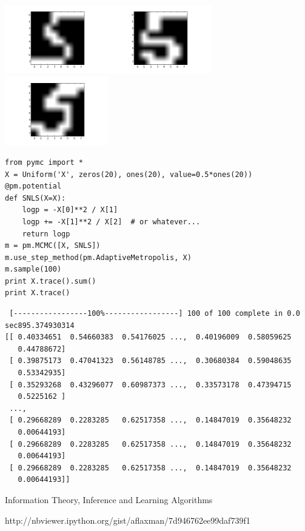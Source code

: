 \documentclass[12pt,fleqn]{article}\usepackage{../common}
\begin{document}
\includegraphics[height=3cm]{boltzmann_01.png}\includegraphics[height=3cm]{boltzmann_02.png}\includegraphics[height=3cm]{boltzmann_03.png}





\begin{verbatim}
from pymc import *
X = Uniform('X', zeros(20), ones(20), value=0.5*ones(20))
@pm.potential
def SNLS(X=X):
    logp = -X[0]**2 / X[1]
    logp += -X[1]**2 / X[2]  # or whatever...
    return logp
m = pm.MCMC([X, SNLS])
m.use_step_method(pm.AdaptiveMetropolis, X)
m.sample(100)
print X.trace().sum()
print X.trace()
\end{verbatim}

\begin{verbatim}
 [-----------------100%-----------------] 100 of 100 complete in 0.0 sec895.374930314
[[ 0.40334651  0.54660383  0.54176025 ...,  0.40196009  0.58059625
   0.44788672]
 [ 0.39875173  0.47041323  0.56148785 ...,  0.30680384  0.59048635
   0.53342935]
 [ 0.35293268  0.43296077  0.60987373 ...,  0.33573178  0.47394715
   0.5225162 ]
 ..., 
 [ 0.29668289  0.2283285   0.62517358 ...,  0.14847019  0.35648232
   0.00644193]
 [ 0.29668289  0.2283285   0.62517358 ...,  0.14847019  0.35648232
   0.00644193]
 [ 0.29668289  0.2283285   0.62517358 ...,  0.14847019  0.35648232
   0.00644193]]
\end{verbatim}


















Information Theory, Inference and Learning Algorithms

http://nbviewer.ipython.org/gist/aflaxman/7d946762ee99daf739f1
\end{document}
